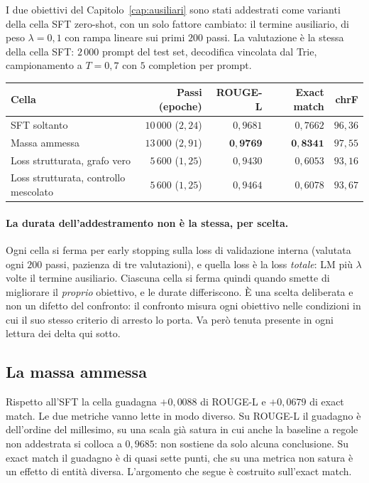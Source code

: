 I due obiettivi del Capitolo~\ref{cap:ausiliari} sono stati addestrati come
varianti della cella SFT zero-shot, con un solo fattore cambiato: il termine
ausiliario, di peso $\lambda = 0{,}1$ con rampa lineare sui primi $200$ passi.
La valutazione è la stessa della cella SFT: $2\,000$ prompt del test set,
decodifica vincolata dal Trie, campionamento a $T = 0{,}7$ con $5$ completion per
prompt.

\begin{center}
\begin{tabular}{lrrrr}
\toprule
Cella & Passi (epoche) & ROUGE-L & Exact match & chrF \\
\midrule
SFT soltanto & $10\,000$ ($2{,}24$) & $0{,}9681$ & $0{,}7662$ & $96{,}36$ \\
Massa ammessa & $13\,000$ ($2{,}91$) & $\mathbf{0{,}9769}$ & $\mathbf{0{,}8341}$ & $97{,}55$ \\
Loss strutturata, grafo vero & $5\,600$ ($1{,}25$) & $0{,}9430$ & $0{,}6053$ & $93{,}16$ \\
Loss strutturata, controllo mescolato & $5\,600$ ($1{,}25$) & $0{,}9464$ & $0{,}6078$ & $93{,}67$ \\
\bottomrule
\end{tabular}
\end{center}

\paragraph{La durata dell'addestramento non è la stessa, per scelta.} Ogni cella
si ferma per early stopping sulla loss di validazione interna (valutata ogni $200$
passi, pazienza di tre valutazioni), e quella loss è la loss \emph{totale}: LM più
$\lambda$ volte il termine ausiliario. Ciascuna cella si ferma quindi quando smette
di migliorare il \emph{proprio} obiettivo, e le durate differiscono. È una scelta
deliberata e non un difetto del confronto: il confronto misura ogni obiettivo
nelle condizioni in cui il suo stesso criterio di arresto lo porta. Va però
tenuta presente in ogni lettura dei delta qui sotto.

\subsection{La massa ammessa}

Rispetto all'SFT la cella guadagna $+0{,}0088$ di ROUGE-L e $+0{,}0679$ di exact
match. Le due metriche vanno lette in modo diverso. Su ROUGE-L il guadagno è
dell'ordine del millesimo, su una scala già satura in cui anche la baseline a
regole non addestrata si colloca a $0{,}9685$: non sostiene da solo alcuna
conclusione. Su exact match il guadagno è di quasi sette punti, che su una
metrica non satura è un effetto di entità diversa. L'argomento che segue è
costruito sull'exact match.


